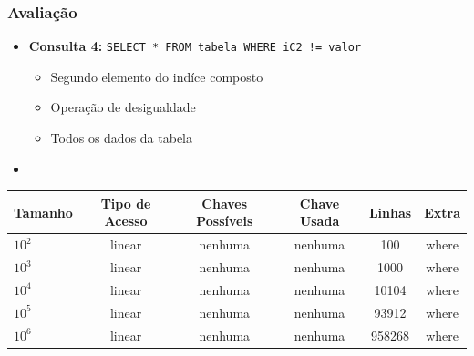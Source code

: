 \documentclass[10pt]{beamer}
\begin{document}
\begin{frame}[fragile]
  \frametitle{Avaliação}

    \begin{itemize}
      \item \textbf{Consulta 4: } \texttt{SELECT * FROM tabela WHERE iC2 != valor}
      \begin{itemize}
        \item[-] Segundo elemento do indíce composto
        \item[-] Operação de desigualdade
        \item[-] Todos os dados da tabela
      \end{itemize}

      \item[\ ] \ 

    \end{itemize}

     \begin{table}[!htb]
    \footnotesize
    \centering
    \begin{tabular}{lccccc}
      \toprule
      \textbf{Tamanho} & \textbf{Tipo de Acesso}  & \textbf{Chaves Possíveis}  & \textbf{Chave Usada} & \textbf{Linhas} & \textbf{Extra}  \\
      \midrule
      $10^2$  & linear  &  nenhuma  & nenhuma  & 100     & where  \\
      $10^3$  & linear  &  nenhuma  & nenhuma  & 1000    & where  \\
      $10^4$  & linear  &  nenhuma  & nenhuma  & 10104   & where  \\
      $10^5$  & linear  &  nenhuma  & nenhuma  & 93912   & where  \\
      $10^6$  & linear  &  nenhuma  & nenhuma  & 958268  & where  \\

      \bottomrule
    \end{tabular}
    \end{table}

\end{frame}
\end{document}
